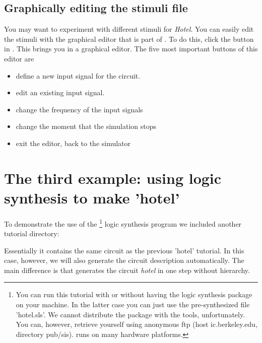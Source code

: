 \subsection{Graphically editing the stimuli file}
You may want to experiment with different stimuli for {\sl Hotel}. You can
easily edit the stimuli with the graphical editor that is part of
. To do this, click the  button in .
This brings you in a graphical editor. The five most important buttons of this
editor are
\begin{itemize}
\item [\button{new}] define a new input signal for the circuit.
\item [\button{edit}] edit an existing input signal.
\item [\button{speed}] change the frequency of the input signals
\item [\button{t\_end}] change the moment that the simulation stops
\item [\button{ready}] exit the editor, back to the simulator
\end{itemize}

\section{The third example: using logic synthesis to make 'hotel'}
\label{kissistutorial}
To demonstrate the use of the \footnote{You can run this tutorial
with or without having the  logic synthesis package on your
machine.  In the latter case you can just use the pre-synthesized file
'hotel.sls'. We cannot distribute the  package with the 
tools, unfortunately. You can, however, retrieve  yourself using
anonymous ftp (host ic.berkeley.edu, directory pub/sis).  runs on
many hardware platforms.} logic synthesis program we included another
tutorial directory:
\cd{} 

Essentially it contains the same circuit as the previous 'hotel' tutorial. In
this case, however, we will also generate the circuit description
automatically. The main difference is that  generates the circuit {\sl
hotel} in one step without hierarchy.

